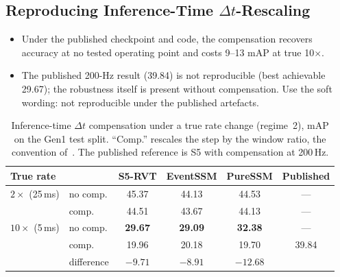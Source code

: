 \documentclass[11pt, a4paper]{report}
\begin{document}
\subsection{Reproducing Inference-Time \texorpdfstring{$\Delta t$}{Delta t}-Rescaling}
\label{subsec:f2}
\begin{itemize}
  \item Under the published checkpoint and code, the compensation recovers accuracy at no tested operating point and costs 9--13 mAP at true 10$\times$.
  \item The published 200-Hz result (39.84) is not reproducible (best achievable 29.67); the robustness itself is present without compensation. Use the soft wording: not reproducible under the published artefacts.
\end{itemize}
\begin{table}[htbp]
\centering
\caption{Inference-time $\Delta t$ compensation under a true rate change (regime~2), mAP on the Gen1
test split. ``Comp.'' rescales the step by the window ratio, the convention of~\cite{zubic2024state}.
The published reference is S5 with compensation at 200\,Hz.}
\label{tab:dt_comp}
\begin{tabular}{llcccc}
\toprule
True rate & & \textbf{S5-RVT} & \textbf{EventSSM} & \textbf{PureSSM} & Published \\
\midrule
$2\times$ (25\,ms)  & no comp.  & 45.37 & 44.13 & 44.53 & --- \\
                    & comp.     & 44.51 & 43.67 & 44.13 & --- \\
\midrule
$10\times$ (5\,ms)  & no comp.  & \textbf{29.67} & \textbf{29.09} & \textbf{32.38} & --- \\
                    & comp.     & 19.96 & 20.18 & 19.70 & 39.84 \\
                    & difference & $-9.71$ & $-8.91$ & $-12.68$ & \\
\bottomrule
\end{tabular}
\end{table}
\end{document}
